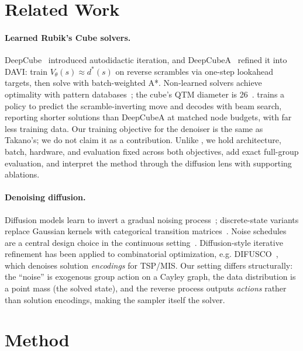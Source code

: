 \documentclass[11pt]{article}
\newcommand{\eg}{e.g.}
\newcommand{\dstar}{d^{*}}
\begin{document}
\section{Related Work}
\label{sec:related}

\paragraph{Learned Rubik's Cube solvers.}
DeepCube~\citep{mcaleer2019} introduced autodidactic iteration, and
DeepCubeA~\citep{agostinelli2019} refined it into DAVI: train
$V_\theta(s)\approx\dstar(s)$ on reverse scrambles via one-step lookahead
targets, then solve with batch-weighted A*. Non-learned solvers achieve
optimality with pattern databases~\citep{korf1997}; the cube's QTM diameter is
26~\citep{rokicki2014}. \citet{takano2023} trains a policy to predict the
scramble-inverting move and decodes with beam search, reporting shorter
solutions than DeepCubeA at matched node budgets, with far less training data.
Our training objective for the denoiser is the same as Takano's; we do not
claim it as a contribution. Unlike \citet{takano2023}, we hold architecture,
batch, hardware, and evaluation fixed across both objectives, add exact
full-group evaluation, and interpret the method through the diffusion lens
with supporting ablations.

\paragraph{Denoising diffusion.}
Diffusion models learn to invert a gradual noising
process~\citep{sohldickstein2015,ho2020,song2019}; discrete-state variants
replace Gaussian kernels with categorical transition
matrices~\citep{austin2021,hoogeboom2021}. Noise schedules are a central
design choice in the continuous setting~\citep{nichol2021}. Diffusion-style
iterative refinement has been applied to combinatorial optimization, \eg{}
DIFUSCO~\citep{sun2023}, which denoises solution \emph{encodings} for TSP/MIS.
Our setting differs structurally: the ``noise'' is exogenous group action on a
Cayley graph, the data distribution is a point mass (the solved state), and
the reverse process outputs \emph{actions} rather than solution encodings,
making the sampler itself the solver.

\section{Method}
\label{sec:method}
\end{document}
